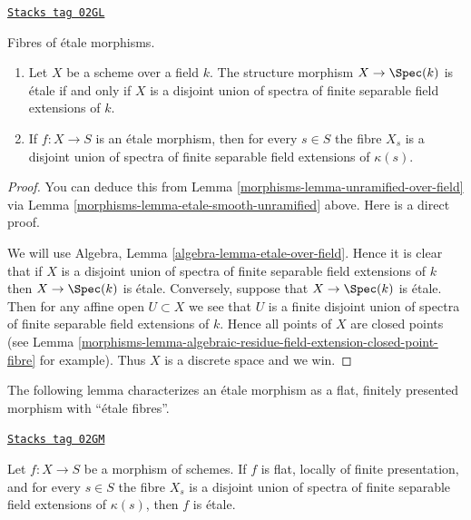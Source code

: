 \begin{lemma}
\label{morphisms-lemma-etale-over-field}
\href{https://stacks.math.columbia.edu/tag/02GL}{\texttt{Stacks tag 02GL}}


Fibres of \'etale morphisms.
\begin{enumerate}
\item Let $X$ be a scheme over a field $k$.
The structure morphism $X \to \Spec(k)$ is \'etale if
and only if $X$ is a disjoint union of spectra of finite separable
field extensions of $k$.
\item If $f : X \to S$ is an \'etale morphism, then for every $s \in S$ the
fibre $X_s$ is a disjoint union of spectra of finite separable field
extensions of $\kappa(s)$.
\end{enumerate}
\end{lemma}

\begin{proof}

You can deduce this from Lemma \ref{morphisms-lemma-unramified-over-field}
via Lemma \ref{morphisms-lemma-etale-smooth-unramified} above.
Here is a direct proof.

\medskip\noindent
We will use Algebra, Lemma \ref{algebra-lemma-etale-over-field}.
Hence it is clear that if $X$ is a disjoint union of spectra of finite
separable field extensions of $k$ then $X \to \Spec(k)$ is \'etale.
Conversely, suppose that $X \to \Spec(k)$ is \'etale. Then for any affine
open $U \subset X$ we see that $U$ is a finite disjoint union of spectra
of finite separable field extensions of $k$. Hence all points of $X$
are closed points (see
Lemma \ref{morphisms-lemma-algebraic-residue-field-extension-closed-point-fibre}
for example). Thus $X$ is a discrete space and we win.
\end{proof}

The following lemma characterizes an \'etale morphism as a
flat, finitely presented morphism with ``\'etale fibres''.

\begin{lemma}
\label{morphisms-lemma-etale-flat-etale-fibres}
\href{https://stacks.math.columbia.edu/tag/02GM}{\texttt{Stacks tag 02GM}}

Let $f : X \to S$ be a morphism of schemes.
If $f$ is flat, locally of finite presentation, and for every $s \in S$
the fibre $X_s$ is a disjoint union of spectra of finite separable
field extensions of $\kappa(s)$, then $f$ is \'etale.
\end{lemma}

